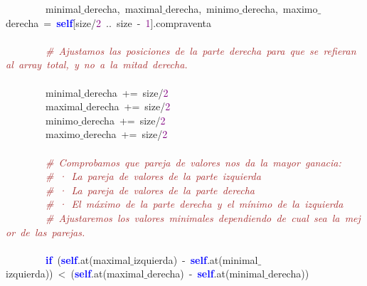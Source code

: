 \mbox{}\ \ \ \ \ \ \ \ minimal$\_$derecha\textcolor{BrickRed}{,}\ maximal$\_$derecha\textcolor{BrickRed}{,}\ minimo$\_$derecha\textcolor{BrickRed}{,}\ maximo$\_$derecha\ \textcolor{BrickRed}{=}\ \textbf{\textcolor{Blue}{self}}\textcolor{BrickRed}{[}size\textcolor{BrickRed}{/}\textcolor{Purple}{2}\ \textcolor{BrickRed}{..}\ size\ \textcolor{BrickRed}{-}\ \textcolor{Purple}{1}\textcolor{BrickRed}{].}compraventa \\
\mbox{} \\
\mbox{}\ \ \ \ \ \ \ \ \textit{\textcolor{Brown}{\#\ Ajustamos\ las\ posiciones\ de\ la\ parte\ derecha\ para\ que\ se\ refieran\ al\ array\ total,\ y\ no\ a\ la\ mitad\ derecha.\ }} \\
\mbox{} \\
\mbox{}\ \ \ \ \ \ \ \ minimal$\_$derecha\ \textcolor{BrickRed}{+=}\ size\textcolor{BrickRed}{/}\textcolor{Purple}{2} \\
\mbox{}\ \ \ \ \ \ \ \ maximal$\_$derecha\ \textcolor{BrickRed}{+=}\ size\textcolor{BrickRed}{/}\textcolor{Purple}{2} \\
\mbox{}\ \ \ \ \ \ \ \ minimo$\_$derecha\ \textcolor{BrickRed}{+=}\ size\textcolor{BrickRed}{/}\textcolor{Purple}{2} \\
\mbox{}\ \ \ \ \ \ \ \ maximo$\_$derecha\ \textcolor{BrickRed}{+=}\ size\textcolor{BrickRed}{/}\textcolor{Purple}{2} \\
\mbox{} \\
\mbox{}\ \ \ \ \ \ \ \ \textit{\textcolor{Brown}{\#\ Comprobamos\ que\ pareja\ de\ valores\ nos\ da\ la\ mayor\ ganacia:\ }} \\
\mbox{}\ \ \ \ \ \ \ \ \textit{\textcolor{Brown}{\#\ ·\ La\ pareja\ de\ valores\ de\ la\ parte\ izquierda}} \\
\mbox{}\ \ \ \ \ \ \ \ \textit{\textcolor{Brown}{\#\ ·\ La\ pareja\ de\ valores\ de\ la\ parte\ derecha}} \\
\mbox{}\ \ \ \ \ \ \ \ \textit{\textcolor{Brown}{\#\ ·\ El\ máximo\ de\ la\ parte\ derecha\ y\ el\ mínimo\ de\ la\ izquierda}} \\
\mbox{}\ \ \ \ \ \ \ \ \textit{\textcolor{Brown}{\#\ Ajustaremos\ los\ valores\ minimales\ dependiendo\ de\ cual\ sea\ la\ mejor\ de\ las\ parejas.\ }} \\
\mbox{} \\
\mbox{}\ \ \ \ \ \ \ \ \textbf{\textcolor{Blue}{if}}\ \textcolor{BrickRed}{(}\textbf{\textcolor{Blue}{self}}\textcolor{BrickRed}{.}at\textcolor{BrickRed}{(}maximal$\_$izquierda\textcolor{BrickRed}{)}\ \textcolor{BrickRed}{-}\ \textbf{\textcolor{Blue}{self}}\textcolor{BrickRed}{.}at\textcolor{BrickRed}{(}minimal$\_$izquierda\textcolor{BrickRed}{))}\ \textcolor{BrickRed}{\textless{}}\ \textcolor{BrickRed}{(}\textbf{\textcolor{Blue}{self}}\textcolor{BrickRed}{.}at\textcolor{BrickRed}{(}maximal$\_$derecha\textcolor{BrickRed}{)}\ \textcolor{BrickRed}{-}\ \textbf{\textcolor{Blue}{self}}\textcolor{BrickRed}{.}at\textcolor{BrickRed}{(}minimal$\_$derecha\textcolor{BrickRed}{))} \\

